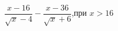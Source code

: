 \begin{ex}[type=calculate_expression]
	\begin{condition}
		\( \dfrac{x-16}{\sqrt{x}-4}-\dfrac{x-36}{\sqrt{x}+6} \),\quad при \( x>16 \)
	\end{condition}
\end{ex}
